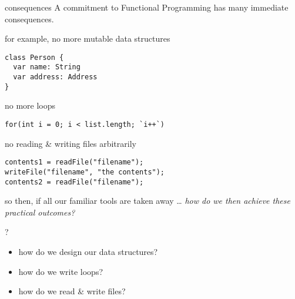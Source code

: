 \begin{frame}
\begin{block}{consequences}
A commitment to Functional Programming has many immediate consequences.
\end{block}
\end{frame}

\begin{frame}[fragile]
\begin{block}{for example, no more mutable data structures}
\begin{lstlisting}[style=java]
class Person {
  var name: String
  var address: Address
}
\end{lstlisting}
\end{block}
\end{frame}

\begin{frame}[fragile]
\begin{block}{no more loops}
\begin{lstlisting}[style=java]
for(int i = 0; i < list.length; `i++`)
\end{lstlisting}
\end{block}
\end{frame}

\begin{frame}[fragile]
\begin{block}{no reading \& writing files arbitrarily}
\begin{lstlisting}[style=java]
contents1 = readFile("filename");
writeFile("filename", "the contents");
contents2 = readFile("filename");
\end{lstlisting}
\end{block}

\end{frame}
\begin{frame}
\begin{block}{so then, if all our familiar tools are taken away \ldots}
\emph{how do we then achieve these practical outcomes?}
\end{block}
\end{frame}

\begin{frame}
\begin{block}{?}
\begin{itemize}
\item how do we design our data structures?
\item how do we write loops?
\item how do we read \& write files?
\end{itemize}
\end{block}
\end{frame}
